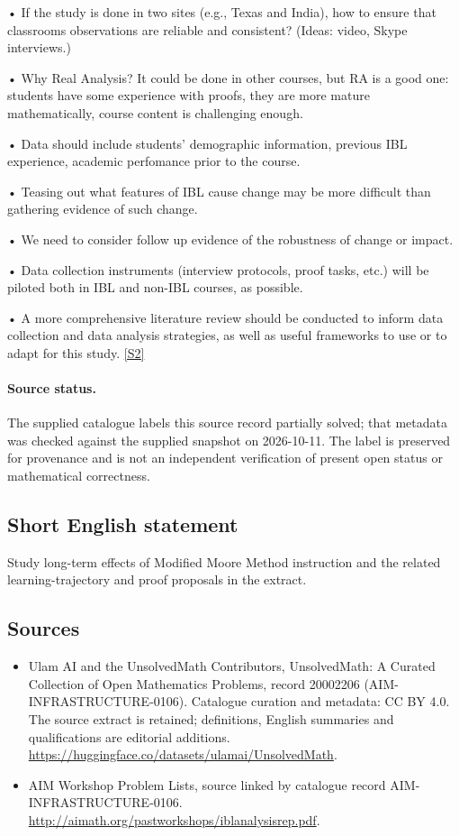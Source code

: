 \documentclass[11pt]{article}
\begin{document}
• If the study is done in two sites (e.g., Texas and India), how to ensure that classrooms observations are reliable and consistent? (Ideas: video, Skype interviews.)

• Why Real Analysis? It could be done in other courses, but RA is a good one: students have some experience with proofs, they are more mature mathematically, course content is challenging enough.

• Data should include students' demographic information, previous IBL experience, academic perfomance prior to the course.

• Teasing out what features of IBL cause change may be more difficult than gathering evidence of such change.

• We need to consider follow up evidence of the robustness of change or impact.

• Data collection instruments (interview protocols, proof tasks, etc.) will be piloted both in IBL and non-IBL courses, as possible.

• A more comprehensive literature review should be conducted to inform data collection and data analysis strategies, as well as useful frameworks to use or to adapt for this study. \href{http://aimath.org/pastworkshops/iblanalysisrep.pdf}{[S2]}
\paragraph{Source status.}
The supplied catalogue labels this source record partially solved; that metadata was checked against the supplied snapshot on 2026-10-11. The label is preserved for provenance and is not an independent verification of present open status or mathematical correctness.
\subsection{Short English statement}
Study long-term effects of Modified Moore Method instruction and the related learning-trajectory and proof proposals in the extract.
\subsection{Sources}
\begin{itemize}
\item[S1] Ulam AI and the UnsolvedMath Contributors, UnsolvedMath: A Curated Collection of Open Mathematics Problems, record 20002206 (AIM-INFRASTRUCTURE-0106). Catalogue curation and metadata: CC BY 4.0. The source extract is retained; definitions, English summaries and qualifications are editorial additions.
\url{https://huggingface.co/datasets/ulamai/UnsolvedMath}.
\item[S2] AIM Workshop Problem Lists, source linked by catalogue record AIM-INFRASTRUCTURE-0106.
\url{http://aimath.org/pastworkshops/iblanalysisrep.pdf}.
\end{itemize}
\end{document}
